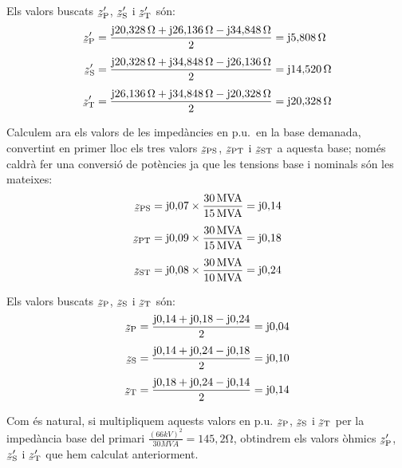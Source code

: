 \begin{exemple}
    Els valors buscats $\cmplx{z}\ped{P}'$, $\cmplx{z}\ped{S}'$ i $\cmplx{z}\ped{T}'$ s\'{o}n:
    \begin{align*}
        \cmplx{z}\ped{P}' &=  \frac{\ju 20{,}328\unit{\ohm} + \ju 26{,}136\unit{\ohm} - \ju 34{,}848\unit{\ohm}}{2} = \ju 5{,}808\unit{\ohm} \\[1ex]
        \cmplx{z}\ped{S}' &=  \frac{\ju 20{,}328\unit{\ohm} + \ju 34{,}848\unit{\ohm} - \ju 26{,}136\unit{\ohm}}{2} = \ju 14{,}520\unit{\ohm} \\[1ex]
        \cmplx{z}\ped{T}' &=  \frac{\ju 26{,}136\unit{\ohm} + \ju 34{,}848\unit{\ohm} - \ju 20{,}328\unit{\ohm}}{2} = \ju 20{,}328\unit{\ohm}
    \end{align*}

    Calculem ara els valors de les imped\`{a}ncies en p.u.\ en la base demanada, convertint en primer lloc els tres valors $\cmplx{z}\ped{PS}$, $\cmplx{z}\ped{PT}$ i $\cmplx{z}\ped{ST}$ a aquesta base; nom\'{e}s caldr\`{a} fer una conversi\'{o} de pot\`{e}ncies ja que les tensions base i nominals s\'{o}n les mateixes:
    \begin{align*}
        \cmplx{z}\ped{PS} &=  \ju 0{,}07 \times \frac{30\unit{MVA}}{15\unit{MVA}} = \ju 0{,}14\\[1ex]
        \cmplx{z}\ped{PT} &=  \ju 0{,}09 \times \frac{30\unit{MVA}}{15\unit{MVA}} = \ju 0{,}18\\[1ex]
        \cmplx{z}\ped{ST} &=  \ju 0{,}08 \times \frac{30\unit{MVA}}{10\unit{MVA}} = \ju 0{,}24
    \end{align*}

    Els valors buscats $\cmplx{z}\ped{P}$, $\cmplx{z}\ped{S}$ i $\cmplx{z}\ped{T}$ s\'{o}n:
    \begin{align*}
        \cmplx{z}\ped{P} &=  \frac{\ju 0{,}14 + \ju 0{,}18 - \ju 0{,}24}{2} = \ju 0{,}04 \\[1ex]
        \cmplx{z}\ped{S} &=  \frac{\ju 0{,}14 + \ju 0{,}24 - \ju 0{,}18}{2} = \ju 0{,}10 \\[1ex]
        \cmplx{z}\ped{T} &=  \frac{\ju 0{,}18 + \ju 0{,}24 - \ju 0{,}14}{2} = \ju 0{,}14
    \end{align*}

     Com \'{e}s natural, si multipliquem aquests valors en p.u.  $\cmplx{z}\ped{P}$, $\cmplx{z}\ped{S}$ i $\cmplx{z}\ped{T}$ per la imped\`{a}ncia base del primari $\frac{(66\unit{kV})^2}{30\unit{MVA}}=145{,}2\unit{\ohm}$, obtindrem els valors \`{o}hmics $\cmplx{z}\ped{P}'$,     $\cmplx{z}\ped{S}'$ i $\cmplx{z}\ped{T}'$ que hem calculat anteriorment.

\end{exemple}


